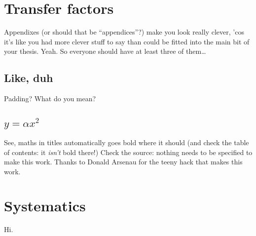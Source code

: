 \chapter{Transfer factors}
\label{app:TFs}


Appendixes (or should that be ``appendices''?) make you look really clever, 'cos
it's like you had more clever stuff to say than could be fitted into the main
bit of your thesis. Yeah. So everyone should have at least three of them\dots

\section{Like, duh}
\label{sec:Duh}
Padding? What do you mean?

\section{$y = \alpha x^2$}
\label{sec:EqnTitle}
See, maths in titles automatically goes bold where it should (and check the
table of contents: it \emph{isn't} bold there!) Check the source: nothing
needs to be specified to make this work. Thanks to Donald Arsenau for the
teeny hack that makes this work.

%

\chapter{Systematics}
\label{app:systs}

Hi.